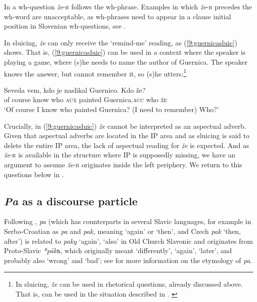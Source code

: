 \documentclass[output=paper,modfonts,newtxmath,hidelinks]{langscibook}
\begin{document}
\noindent In a wh-question \textit{že}-\textsc{r} follows the wh-phrase. Examples in which \textit{že}-\textsc{r} precedes the wh-word are unacceptable, as wh-phrases need to appear in a clause initial position in Slovenian wh-questions, see \cite{mismas2016benj}. 

\z

\noindent In sluicing, \textit{že} can only receive the `remind-me' reading, as (\ref{9:guernicasluic}) shows. That is, (\ref{9:guernicasluic}) can be used in a context where the speaker is playing a game, where (s)he needs to name the author of Guernica. The speaker knows the answer, but cannot remember it, so (s)he utters:\footnote{In sluicing, \textit{že} can be used in rhetorical questions, already discussed above. That is,  can be used in the situation described in .
\label{9:zakajzefn}
\zlast}

\ea \label{9:guernicasluic}
\gll  Seveda vem, kdo je naslikal Guernico. Kdo že?\\
{of course} know who \textsc{aux} painted Guernica.\textsc{acc} who \textsc{že}\\
\glt `Of course I know who painted Guernica? (I need to remember) Who?'
\z

\noindent Crucially, in (\ref{9:guernicasluic}) \textit{že} cannot be interpreted as an aspectual adverb. Given that aspectual adverbs are located in the IP area and as sluicing is said to delete the entire IP area, the lack of aspectual reading for \textit{že} is expected. And as \textit{že}-\textsc{r} is available in the structure where IP is supposedly missing, we have an argument to assume \textit{že}-\textsc{r} originates inside the left periphery. We return to this questions below in . 


\subsection{\textit{Pa} as a discourse particle}

Following \cite{snoj2009}, \textit{pa} (which has counterparts in several Slavic languages, for example in Serbo-Croatian as \textit{pa} and \textit{pak,} meaning `again' or `then', and Czech \textit{pak} `then, after') is related to \textit{paky} `again', `also' in Old Church Slavonic and originates from Proto-Slavic \textit{*pȃkъ}, which originally meant `differently', `again', `later', and probably also `wrong' and `bad'; see \cite{snoj2009} for more information on the etymology of \textit{pa}.
\end{document}
